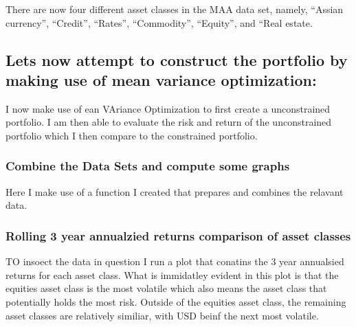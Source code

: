 \documentclass[11pt,preprint, authoryear]{elsarticle}
\numberwithin{equation}{section}
\numberwithin{figure}{section}
\numberwithin{table}{section}
\begin{document}
There are now four different asset classes in the MAA data set, namely,
``Assian currency'', ``Credit'', ``Rates'', ``Commodity'', ``Equity'',
and ``Real estate.

\hypertarget{lets-now-attempt-to-construct-the-portfolio-by-making-use-of-mean-variance-optimization}{%
\subsection{Lets now attempt to construct the portfolio by making use of
mean variance
optimization:}\label{lets-now-attempt-to-construct-the-portfolio-by-making-use-of-mean-variance-optimization}}

I now make use of ean VAriance Optimization to first create a
unconstrained portfolio. I am then able to evaluate the risk and return
of the unconstrained portfolio which I then compare to the constrained
portfolio.

\hypertarget{combine-the-data-sets-and-compute-some-graphs}{%
\subsubsection{Combine the Data Sets and compute some
graphs}\label{combine-the-data-sets-and-compute-some-graphs}}

Here I make use of a function I created that prepares and combines the
relavant data.

\hypertarget{rolling-3-year-annualzied-returns-comparison-of-asset-classes}{%
\subsubsection{Rolling 3 year annualzied returns comparison of asset
classes}\label{rolling-3-year-annualzied-returns-comparison-of-asset-classes}}

TO insoect the data in question I run a plot that conatins the 3 year
annualsied returns for each asset class. What is immidatley evident in
this plot is that the equities asset class is the most volatile which
also means the asset class that potentially holds the most risk. Outside
of the equities asset class, the remaining asset classes are relatively
similiar, with USD beinf the next most volatile.
\end{document}
